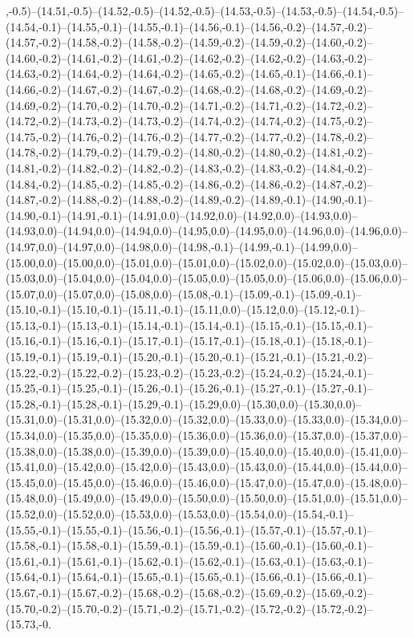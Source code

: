 ,-0.5)--(14.51,-0.5)--(14.52,-0.5)--(14.52,-0.5)--(14.53,-0.5)--(14.53,-0.5)--(14.54,-0.5)--(14.54,-0.1)--(14.55,-0.1)--(14.55,-0.1)--(14.56,-0.1)--(14.56,-0.2)--(14.57,-0.2)--(14.57,-0.2)--(14.58,-0.2)--(14.58,-0.2)--(14.59,-0.2)--(14.59,-0.2)--(14.60,-0.2)--(14.60,-0.2)--(14.61,-0.2)--(14.61,-0.2)--(14.62,-0.2)--(14.62,-0.2)--(14.63,-0.2)--(14.63,-0.2)--(14.64,-0.2)--(14.64,-0.2)--(14.65,-0.2)--(14.65,-0.1)--(14.66,-0.1)--(14.66,-0.2)--(14.67,-0.2)--(14.67,-0.2)--(14.68,-0.2)--(14.68,-0.2)--(14.69,-0.2)--(14.69,-0.2)--(14.70,-0.2)--(14.70,-0.2)--(14.71,-0.2)--(14.71,-0.2)--(14.72,-0.2)--(14.72,-0.2)--(14.73,-0.2)--(14.73,-0.2)--(14.74,-0.2)--(14.74,-0.2)--(14.75,-0.2)--(14.75,-0.2)--(14.76,-0.2)--(14.76,-0.2)--(14.77,-0.2)--(14.77,-0.2)--(14.78,-0.2)--(14.78,-0.2)--(14.79,-0.2)--(14.79,-0.2)--(14.80,-0.2)--(14.80,-0.2)--(14.81,-0.2)--(14.81,-0.2)--(14.82,-0.2)--(14.82,-0.2)--(14.83,-0.2)--(14.83,-0.2)--(14.84,-0.2)--(14.84,-0.2)--(14.85,-0.2)--(14.85,-0.2)--(14.86,-0.2)--(14.86,-0.2)--(14.87,-0.2)--(14.87,-0.2)--(14.88,-0.2)--(14.88,-0.2)--(14.89,-0.2)--(14.89,-0.1)--(14.90,-0.1)--(14.90,-0.1)--(14.91,-0.1)--(14.91,0.0)--(14.92,0.0)--(14.92,0.0)--(14.93,0.0)--(14.93,0.0)--(14.94,0.0)--(14.94,0.0)--(14.95,0.0)--(14.95,0.0)--(14.96,0.0)--(14.96,0.0)--(14.97,0.0)--(14.97,0.0)--(14.98,0.0)--(14.98,-0.1)--(14.99,-0.1)--(14.99,0.0)--(15.00,0.0)--(15.00,0.0)--(15.01,0.0)--(15.01,0.0)--(15.02,0.0)--(15.02,0.0)--(15.03,0.0)--(15.03,0.0)--(15.04,0.0)--(15.04,0.0)--(15.05,0.0)--(15.05,0.0)--(15.06,0.0)--(15.06,0.0)--(15.07,0.0)--(15.07,0.0)--(15.08,0.0)--(15.08,-0.1)--(15.09,-0.1)--(15.09,-0.1)--(15.10,-0.1)--(15.10,-0.1)--(15.11,-0.1)--(15.11,0.0)--(15.12,0.0)--(15.12,-0.1)--(15.13,-0.1)--(15.13,-0.1)--(15.14,-0.1)--(15.14,-0.1)--(15.15,-0.1)--(15.15,-0.1)--(15.16,-0.1)--(15.16,-0.1)--(15.17,-0.1)--(15.17,-0.1)--(15.18,-0.1)--(15.18,-0.1)--(15.19,-0.1)--(15.19,-0.1)--(15.20,-0.1)--(15.20,-0.1)--(15.21,-0.1)--(15.21,-0.2)--(15.22,-0.2)--(15.22,-0.2)--(15.23,-0.2)--(15.23,-0.2)--(15.24,-0.2)--(15.24,-0.1)--(15.25,-0.1)--(15.25,-0.1)--(15.26,-0.1)--(15.26,-0.1)--(15.27,-0.1)--(15.27,-0.1)--(15.28,-0.1)--(15.28,-0.1)--(15.29,-0.1)--(15.29,0.0)--(15.30,0.0)--(15.30,0.0)--(15.31,0.0)--(15.31,0.0)--(15.32,0.0)--(15.32,0.0)--(15.33,0.0)--(15.33,0.0)--(15.34,0.0)--(15.34,0.0)--(15.35,0.0)--(15.35,0.0)--(15.36,0.0)--(15.36,0.0)--(15.37,0.0)--(15.37,0.0)--(15.38,0.0)--(15.38,0.0)--(15.39,0.0)--(15.39,0.0)--(15.40,0.0)--(15.40,0.0)--(15.41,0.0)--(15.41,0.0)--(15.42,0.0)--(15.42,0.0)--(15.43,0.0)--(15.43,0.0)--(15.44,0.0)--(15.44,0.0)--(15.45,0.0)--(15.45,0.0)--(15.46,0.0)--(15.46,0.0)--(15.47,0.0)--(15.47,0.0)--(15.48,0.0)--(15.48,0.0)--(15.49,0.0)--(15.49,0.0)--(15.50,0.0)--(15.50,0.0)--(15.51,0.0)--(15.51,0.0)--(15.52,0.0)--(15.52,0.0)--(15.53,0.0)--(15.53,0.0)--(15.54,0.0)--(15.54,-0.1)--(15.55,-0.1)--(15.55,-0.1)--(15.56,-0.1)--(15.56,-0.1)--(15.57,-0.1)--(15.57,-0.1)--(15.58,-0.1)--(15.58,-0.1)--(15.59,-0.1)--(15.59,-0.1)--(15.60,-0.1)--(15.60,-0.1)--(15.61,-0.1)--(15.61,-0.1)--(15.62,-0.1)--(15.62,-0.1)--(15.63,-0.1)--(15.63,-0.1)--(15.64,-0.1)--(15.64,-0.1)--(15.65,-0.1)--(15.65,-0.1)--(15.66,-0.1)--(15.66,-0.1)--(15.67,-0.1)--(15.67,-0.2)--(15.68,-0.2)--(15.68,-0.2)--(15.69,-0.2)--(15.69,-0.2)--(15.70,-0.2)--(15.70,-0.2)--(15.71,-0.2)--(15.71,-0.2)--(15.72,-0.2)--(15.72,-0.2)--(15.73,-0.